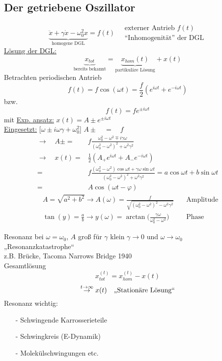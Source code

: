 \documentclass[titlepage,12pt,a4paper,ngerman]{report}
\begin{document}
{\subsection{Der getriebene Oszillator}
$$\underbrace{\ddot{x} + \gamma \dot{x} - \omega^2_0 x}_{\textrm{homogene DGL}} = f(t) \quad \substack{\textrm{externer Antrieb } f(t) \\ \textrm{``Inhomogenität'' der DGL}}$$
\underline{Lösung der DGL:}
$$\underbrace{x_{tot}}_{\textrm{bereits bekannt}} = \underbrace{x_{hom}(t)}_{\textrm{partikuläre Lösung}} + x (t)$$
Betrachten periodischen Antrieb
$$f (t) = f \cos(\omega t) = \frac{f}{2} ( e^{i \omega t} + e^{-i \omega t})$$
bzw.
$$f(t) = fe^{\pm i \omega t}$$
mit \underline{Exp. ansatz:} $x(t) = A \pm e^{\pm i \omega t}$\\
\underline{Eingesetzt:} [$\omega \pm i \omega \gamma + \omega_0^2$] $A \pm \quad = \quad f$ 
\begin{align*}
\rightarrow \quad A \pm =& f \frac{\omega^2_0 - \omega^2 \mp i \gamma \omega}{(\omega_0^2 - \omega^2)^2 + \omega^2 \gamma^2}\\[10pt]
\rightarrow \quad x(t) =& \frac{1}{2}(A_+e^{i \omega t}+A_- e^{-i \omega t})\\[10pt] 
=& f\frac{(\omega_0^2 - \omega^2) \cos \omega t + \gamma \omega \sin \omega t}{(\omega_0^2 - \omega^2)^2 + \omega^2 \gamma^2} = a \cos \omega t + b \sin \omega t\\[10pt]
=& A \cos (\omega t - \varphi)
\end{align*}
\begin{align*}
&A = \sqrt{a^2 +b^2} \rightarrow A(\omega) = \frac{f}{\sqrt{(\omega^2_0 - \omega^2)^2 - \omega^2 \gamma^2}} \quad &\textrm{Amplitude}\\[15pt]
&\tan(y) = \frac{a}{b} \rightarrow y(\omega) = \arctan\bigg(\frac{\gamma \omega}{\omega^2_0 - \omega^2}\bigg ) \quad &\textrm{Phase}
\end{align*}




Resonanz bei $\omega = \omega_0$, $A$ groß für $\gamma$ klein
$\gamma \to 0$ und $\omega \to \omega_0$ 	„Resonanzkatastrophe“\\
z.B. Brücke, Tacoma Narrows Bridge 1940\\
Gesamtlösung $$x_{tot}^{(t)} = x_{hom}^{(t)} - x (t)$$
$$\buildrel{t \to \infty}\over{\rightarrow} x(t) \quad \textrm{,,Stationäre Lösung``} $$
Resonanz wichtig: \begin{itemize}
	\item[-] Schwingende Karrosserieteile
	\item[-] Schwingkreis (E-Dynamik)
	\item[-] Molekülschwingungen etc.
\end{itemize}

}
\end{document}
